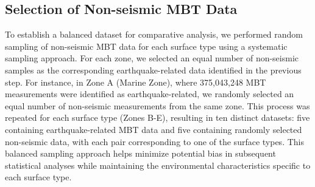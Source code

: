 \documentclass[fleqn,10pt]{wlscirep_mdpi_style}
\begin{document}
\subsection{Selection of Non-seismic MBT Data}
To establish a balanced dataset for comparative analysis, we performed random sampling of non-seismic MBT data for each surface type using a systematic sampling approach. For each zone, we selected an equal number of non-seismic samples as the corresponding earthquake-related data identified in the previous step. For instance, in Zone A (Marine Zone), where 375,043,248 MBT measurements were identified as earthquake-related, we randomly selected an equal number of non-seismic measurements from the same zone. This process was repeated for each surface type (Zones B-E), resulting in ten distinct datasets: five containing earthquake-related MBT data and five containing randomly selected non-seismic data, with each pair corresponding to one of the surface types. This balanced sampling approach helps minimize potential bias in subsequent statistical analyses while maintaining the environmental characteristics specific to each surface type.
\end{document}
